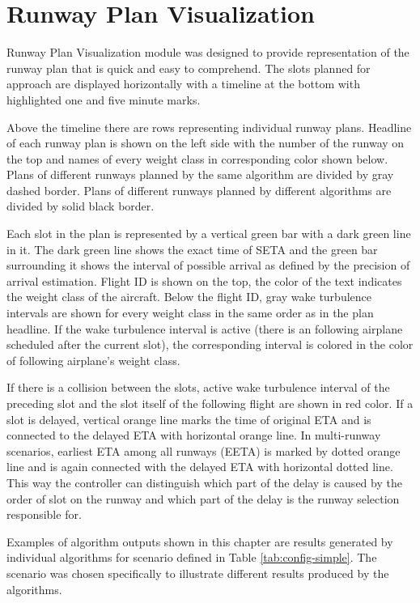 \section{Runway Plan Visualization}

\label{section:runway-visualization}

Runway Plan Visualization module was designed to provide representation of the runway plan that is quick and easy to comprehend. The slots planned for approach are displayed horizontally with a timeline at the bottom with highlighted one and five minute marks.

Above the timeline there are rows representing individual runway plans. Headline of each runway plan is shown on the left side with the number of the runway on the top and names of every weight class in corresponding color shown below. Plans of different runways planned by the same algorithm are divided by gray dashed border. Plans of different runways planned by different algorithms are divided by solid black border.

Each slot in the plan is represented by a vertical green bar with a dark green line in it. The dark green line shows the exact time of SETA and the green bar surrounding it shows the interval of possible arrival as defined by the precision of arrival estimation. Flight ID is shown on the top, the color of the text indicates the weight class of the aircraft. Below the flight ID, gray wake turbulence intervals are shown for every weight class in the same order as in the plan headline. If the wake turbulence interval is active (there is an following airplane scheduled after the current slot), the corresponding interval is colored in the color of following airplane's weight class.

If there is a collision between the slots, active wake turbulence interval of the preceding slot and the slot itself of the following flight are shown in red color. If a slot is delayed, vertical orange line marks the time of original ETA and is connected to the delayed ETA with horizontal orange line. In multi-runway scenarios, earliest ETA among all runways (EETA) is marked by dotted orange line and is again connected with the delayed ETA with horizontal dotted line. This way the controller can distinguish which part of the delay is caused by the order of slot on the runway and which part of the delay is the runway selection responsible for.

Examples of algorithm outputs shown in this chapter are results generated by individual algorithms for scenario defined in Table \ref{tab:config-simple}. The scenario was chosen specifically to illustrate different results produced by the algorithms.

